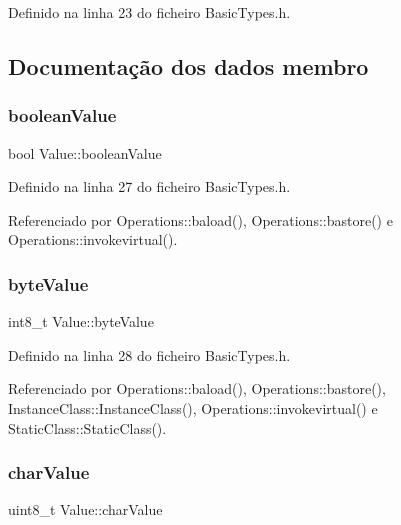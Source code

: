 Definido na linha 23 do ficheiro Basic\+Types.\+h.



\subsection{Documentação dos dados membro}
\mbox{\label{structValue_a30e34bb4435bed7be1c5287e8f4c4838}} 
\subsubsection{\texorpdfstring{boolean\+Value}{booleanValue}}
{\footnotesize\ttfamily bool Value\+::boolean\+Value}



Definido na linha 27 do ficheiro Basic\+Types.\+h.



Referenciado por Operations\+::baload(), Operations\+::bastore() e Operations\+::invokevirtual().

\mbox{\label{structValue_a5fe45e55ee027508eaa68b9133776591}} 
\subsubsection{\texorpdfstring{byte\+Value}{byteValue}}
{\footnotesize\ttfamily int8\+\_\+t Value\+::byte\+Value}



Definido na linha 28 do ficheiro Basic\+Types.\+h.



Referenciado por Operations\+::baload(), Operations\+::bastore(), Instance\+Class\+::\+Instance\+Class(), Operations\+::invokevirtual() e Static\+Class\+::\+Static\+Class().

\mbox{\label{structValue_a100a56df80b9c3f796f053b9eef2b69a}} 
\subsubsection{\texorpdfstring{char\+Value}{charValue}}
{\footnotesize\ttfamily uint8\+\_\+t Value\+::char\+Value}



